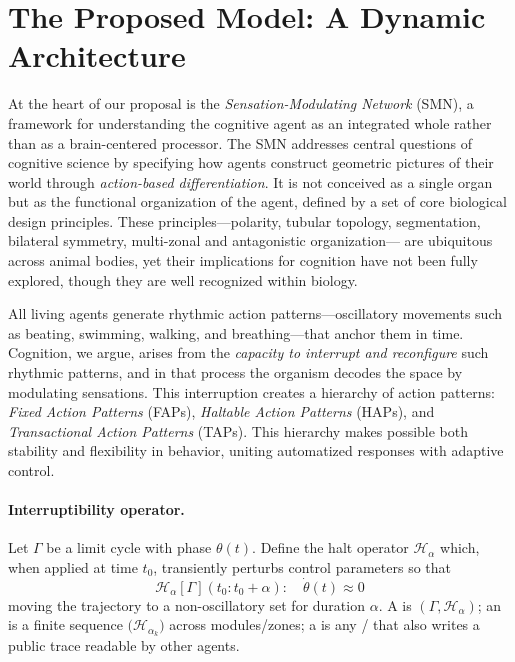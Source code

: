 
\section{The Proposed Model: A Dynamic Architecture}
\label{sec:model}

At the heart of our proposal is the \emph{Sensation-Modulating Network} (SMN), 
a framework for understanding the cognitive agent as an integrated whole rather than 
as a brain-centered processor. The SMN addresses central questions of cognitive science 
by specifying how agents construct geometric pictures of their world through 
\emph{action-based differentiation}. It is not conceived as a single organ but as the 
functional organization of the agent, defined by a set of core biological design principles. 
These principles—polarity, tubular topology, segmentation, bilateral symmetry, multi-zonal and antagonistic organization—
are ubiquitous across animal bodies, yet their implications 
for cognition have not been fully explored, though they are well recognized within biology.

All living agents generate rhythmic action patterns—oscillatory movements such as beating, 
swimming, walking, and breathing—that anchor them in time. Cognition, we argue, arises from 
the \emph{capacity to interrupt and reconfigure} such rhythmic patterns, and in that process the organism decodes the space by modulating sensations. This interruption 
creates a hierarchy of action patterns: 
\emph{Fixed Action Patterns} (FAPs), \emph{Haltable Action Patterns} (HAPs), and 
\emph{Transactional Action Patterns} (TAPs). 
This hierarchy makes possible both stability and flexibility in behavior, uniting automatized responses with adaptive control. 

\paragraph{Interruptibility operator.}\label{interrupt-operator}
Let $\Gamma$ be a \FAP{} limit cycle with phase $\theta(t)$.
Define the halt operator $\mathcal{H}_{\alpha}$ which, when applied at time $t_0$, transiently perturbs control parameters so that
\[
\mathcal{H}_{\alpha}[\Gamma](t_0\!:\!t_0{+}\alpha):\quad \dot\theta(t)\approx 0
\]
moving the trajectory to a non-oscillatory set for duration $\alpha$. 
A \HAP{} is $(\Gamma,\mathcal{H}_\alpha)$; an \OAP{} is a finite sequence $\big(\mathcal{H}_{\alpha_k}\big)$ across modules/zones; a \TAP{} is any \HAP{}/\OAP{} that also writes a public trace readable by other agents.

